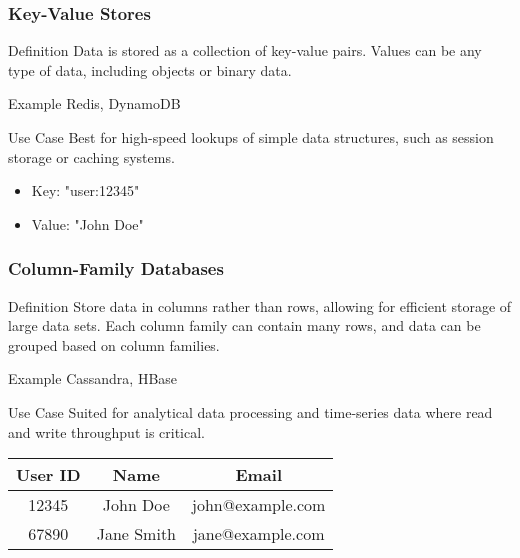 \documentclass[aspectratio=169]{beamer}
\begin{document}
\begin{frame}
    \frametitle{Key-Value Stores}
    \begin{block}{Definition}
        Data is stored as a collection of key-value pairs. Values can be any type of data, including objects or binary data.
    \end{block}
    
    \begin{block}{Example}
        Redis, DynamoDB
    \end{block}
    
    \begin{block}{Use Case}
        Best for high-speed lookups of simple data structures, such as session storage or caching systems.
    \end{block}
    
    \begin{itemize}
        \item Key: "user:12345"
        \item Value: "John Doe"
    \end{itemize}
\end{frame}

\begin{frame}
    \frametitle{Column-Family Databases}
    \begin{block}{Definition}
        Store data in columns rather than rows, allowing for efficient storage of large data sets. Each column family can contain many rows, and data can be grouped based on column families.
    \end{block}
    
    \begin{block}{Example}
        Cassandra, HBase
    \end{block}
    
    \begin{block}{Use Case}
        Suited for analytical data processing and time-series data where read and write throughput is critical.
    \end{block}
    
    \begin{tabular}{|c|c|c|}
        \hline
        User ID & Name        & Email                \\
        \hline
        12345   & John Doe   & john@example.com     \\
        \hline
        67890   & Jane Smith & jane@example.com     \\
        \hline
    \end{tabular}
\end{frame}
\end{document}
